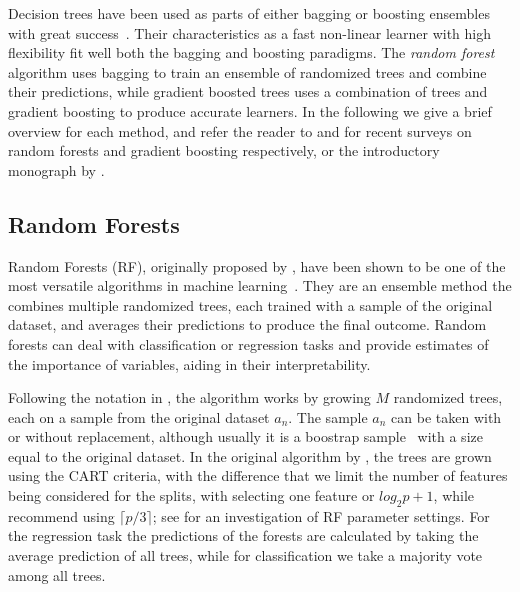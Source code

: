Decision trees have been used as parts of either bagging
or boosting ensembles with great success~\cite{hundreds-classifiers}. Their characteristics as a fast
non-linear learner
with high flexibility fit well both the bagging and boosting paradigms.
The \emph{random forest} algorithm uses bagging to train an ensemble
of randomized trees and combine their predictions, while gradient boosted trees
uses a combination of trees and gradient boosting to produce
accurate learners. In the following we give a brief overview for each method,
and refer the reader to \cite{random-forest-survey, tree-survey} and \cite{biau-optimization} for recent surveys on
random forests and gradient boosting respectively, or the introductory monograph by \citet{esl}.

\subsection{Random Forests}
\label{sec:bg-dt-random-forests}

Random Forests (RF), originally proposed by \citet{random-forests}, have been shown to be one of the
most versatile algorithms in machine learning~\cite{hundreds-classifiers}. They are an
ensemble method the combines multiple randomized trees, each trained with a sample
of the original dataset, and averages their predictions to produce the final outcome.
Random forests can deal with classification or regression tasks and provide estimates
of the importance of variables, aiding in their interpretability.

Following the notation in \cite{random-forest-survey}, the algorithm works by growing
$M$ randomized trees, each on a sample from the original dataset $a_n$. The sample
$a_n$ can be taken with or without replacement, although usually it is a boostrap
sample~\cite{bootstrap} with a size equal to the original dataset. In the original
algorithm by \citeauthor{random-forests}, the trees are grown using the CART criteria,
with the difference that we limit the number of features being
considered for the splits, with \citeauthor{random-forests} selecting one feature or
$log_2{p} + 1$, while \citeauthor{random-forest-survey} recommend using $\lceil p/3 \rceil$;
see \cite{rf-parameters} for an investigation of RF parameter settings.
For the regression task the predictions of the forests are calculated
by taking the average prediction of all trees, while for classification
we take a majority vote among all trees.

